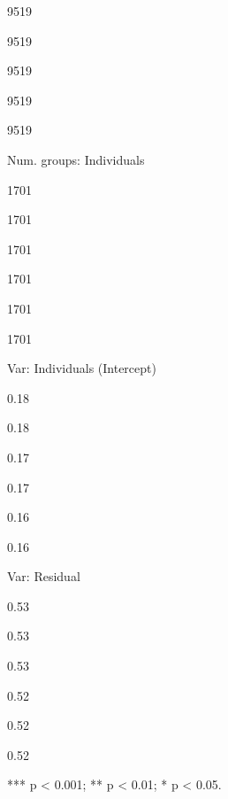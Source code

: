\documentclass[
]{article}
\begin{document}
9519

9519

9519

9519

9519

Num. groups: Individuals

1701

1701

1701

1701

1701

1701

Var: Individuals (Intercept)

0.18

0.18

0.17

0.17

0.16

0.16

Var: Residual

0.53

0.53

0.53

0.52

0.52

0.52

*** p \textless{} 0.001; ** p \textless{} 0.01; * p \textless{} 0.05.
\end{document}
